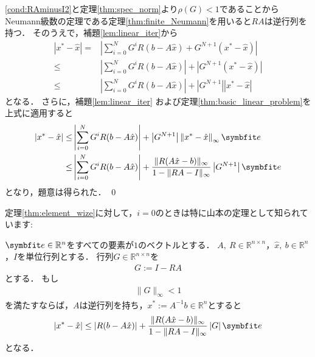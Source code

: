 \begin{Proof}
	\eqref{cond:RAminusI2}と定理\ref{thm:spec_norm}より$\rho(G) < 1$であることからNeumann級数の定理である定理\ref{thm:finite_Neumann}を用いると$RA$は逆行列を持つ．
	そのうえで，補題\ref{lem:linear_iter}から
	\begin{align*}
		\left| x^* - \hat{x} \right| =& \left|  \sum_{i = 0}^N G^i R (b - A \hat{x}) + G^{N + 1}( x^* - \hat{x} ) \right| \\
	\le& \left|  \sum_{i = 0}^N G^i R (b - A \hat{x}) \right| + \left| G^{N + 1}( x^* - \hat{x} ) \right| \\
	\le& \left|  \sum_{i = 0}^N G^i R (b - A \hat{x}) \right| + \left| G^{N + 1} \right| \left| x^* - \hat{x} \right|
	\end{align*}
	となる．
	さらに，補題\ref{lem:linear_iter} および定理\ref{thm:basic_linear_problem}を上式に適用すると
	\begin{align*}
		\left| x^* - \hat{x} \right| \le& \left|  \sum_{i = 0}^N G^i R (b - A \hat{x}) \right| + \left| G^{N + 1} \right| \left\| x^* - \hat{x} \right\|_{\infty} \vector{e} \\
		\le& \left| \sum_{i = 0}^N G^i R (b - A \hat{x}) \right| + \frac{ \|R(A\hat{x}-b)\|_{\infty} }{ 1-\|RA-I\|_{\infty} } \left| G^{N + 1} \right| \vector{e} 
	\end{align*}
	となり，題意は得られた．
\qed
\end{Proof}

定理\ref{thm:element_wize}に対して，$i = 0$のときは特に山本の定理として知られています:
\begin{Cor}\label{cor:yamamoto}
	$\vector{e} \in {\mathbb R}^n$をすべての要素が$1$のベクトルとする．
	$A,\ R\in {\mathbb R}^{n\times n}$，$\hat{x},\ b\in {\mathbb R}^n$，$I$を単位行列とする．
	行列$G \in {\mathbb R}^{n\times n}$を
	\begin{align*}
		G := I - RA
	\end{align*}
	とする．
	もし
	\begin{align*}
		\| G  \|_{\infty} < 1
	\end{align*}
	を満たすならば，$A$は逆行列を持ち，$x^* := A^{-1}b \in {\mathbb R}^n$とすると
	\begin{align*}
		| x^* - \hat{x} | \leq \left| R (b - A \hat{x}) \right| + \frac{ \|R(A\hat{x}-b)\|_{\infty} }{ 1-\|RA-I\|_{\infty} } \left| G \right| \vector{e} 
	\end{align*}
	となる．
\end{Cor}




